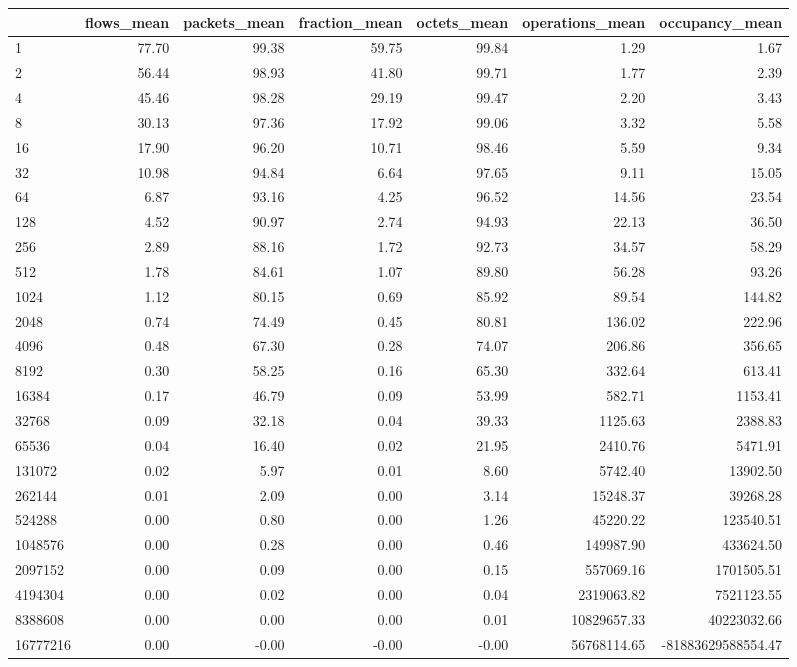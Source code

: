 \begin{tabular}{lrrrrrr}
\toprule
 & flows_mean & packets_mean & fraction_mean & octets_mean & operations_mean & occupancy_mean \\
\midrule
1 & 77.70 & 99.38 & 59.75 & 99.84 & 1.29 & 1.67 \\
2 & 56.44 & 98.93 & 41.80 & 99.71 & 1.77 & 2.39 \\
4 & 45.46 & 98.28 & 29.19 & 99.47 & 2.20 & 3.43 \\
8 & 30.13 & 97.36 & 17.92 & 99.06 & 3.32 & 5.58 \\
16 & 17.90 & 96.20 & 10.71 & 98.46 & 5.59 & 9.34 \\
32 & 10.98 & 94.84 & 6.64 & 97.65 & 9.11 & 15.05 \\
64 & 6.87 & 93.16 & 4.25 & 96.52 & 14.56 & 23.54 \\
128 & 4.52 & 90.97 & 2.74 & 94.93 & 22.13 & 36.50 \\
256 & 2.89 & 88.16 & 1.72 & 92.73 & 34.57 & 58.29 \\
512 & 1.78 & 84.61 & 1.07 & 89.80 & 56.28 & 93.26 \\
1024 & 1.12 & 80.15 & 0.69 & 85.92 & 89.54 & 144.82 \\
2048 & 0.74 & 74.49 & 0.45 & 80.81 & 136.02 & 222.96 \\
4096 & 0.48 & 67.30 & 0.28 & 74.07 & 206.86 & 356.65 \\
8192 & 0.30 & 58.25 & 0.16 & 65.30 & 332.64 & 613.41 \\
16384 & 0.17 & 46.79 & 0.09 & 53.99 & 582.71 & 1153.41 \\
32768 & 0.09 & 32.18 & 0.04 & 39.33 & 1125.63 & 2388.83 \\
65536 & 0.04 & 16.40 & 0.02 & 21.95 & 2410.76 & 5471.91 \\
131072 & 0.02 & 5.97 & 0.01 & 8.60 & 5742.40 & 13902.50 \\
262144 & 0.01 & 2.09 & 0.00 & 3.14 & 15248.37 & 39268.28 \\
524288 & 0.00 & 0.80 & 0.00 & 1.26 & 45220.22 & 123540.51 \\
1048576 & 0.00 & 0.28 & 0.00 & 0.46 & 149987.90 & 433624.50 \\
2097152 & 0.00 & 0.09 & 0.00 & 0.15 & 557069.16 & 1701505.51 \\
4194304 & 0.00 & 0.02 & 0.00 & 0.04 & 2319063.82 & 7521123.55 \\
8388608 & 0.00 & 0.00 & 0.00 & 0.01 & 10829657.33 & 40223032.66 \\
16777216 & 0.00 & -0.00 & -0.00 & -0.00 & 56768114.65 & -81883629588554.47 \\
\bottomrule
\end{tabular}
